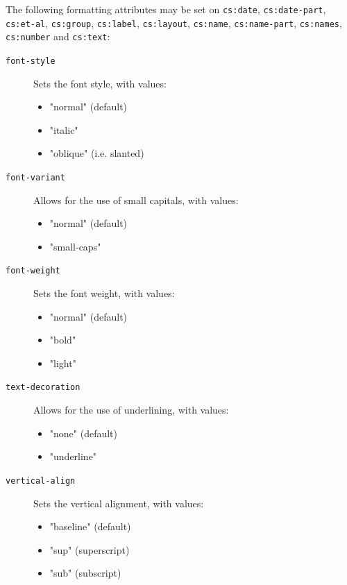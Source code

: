 The following formatting attributes may be set on \texttt{cs:date},
\texttt{cs:date-part}, \texttt{cs:et-al}, \texttt{cs:group},
\texttt{cs:label}, \texttt{cs:layout}, \texttt{cs:name},
\texttt{cs:name-part}, \texttt{cs:names}, \texttt{cs:number} and
\texttt{cs:text}:

\begin{description}
\item[\texttt{font-style}]
Sets the font style, with values:

\begin{itemize}
\tightlist
\item
  "normal" (default)
\item
  "italic"
\item
  "oblique" (i.e. slanted)
\end{itemize}
\item[\texttt{font-variant}]
Allows for the use of small capitals, with values:

\begin{itemize}
\tightlist
\item
  "normal" (default)
\item
  "small-caps"
\end{itemize}
\item[\texttt{font-weight}]
Sets the font weight, with values:

\begin{itemize}
\tightlist
\item
  "normal" (default)
\item
  "bold"
\item
  "light"
\end{itemize}
\item[\texttt{text-decoration}]
Allows for the use of underlining, with values:

\begin{itemize}
\tightlist
\item
  "none" (default)
\item
  "underline"
\end{itemize}
\item[\texttt{vertical-align}]
Sets the vertical alignment, with values:

\begin{itemize}
\tightlist
\item
  "baseline" (default)
\item
  "sup" (superscript)
\item
  "sub" (subscript)
\end{itemize}
\end{description}

